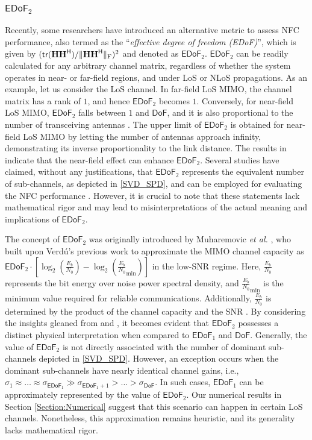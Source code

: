 \documentclass[journal]{IEEEtran}
\theoremstyle{definition}
\begin{document}
\subsubsection{${\mathsf{EDoF}}_2$}
Recently, some researchers have introduced an alternative metric to assess NFC performance, also termed as the ``\emph{effective degree of freedom (EDoF)}'', which is given by $({\mathsf{tr}}({\mathbf{HH}}^{\mathsf{H}})/\lVert{\mathbf{HH}}^{\mathsf{H}}\rVert_{\rm{F}})^2$ and denoted as ${\mathsf{EDoF}}_2$. ${\mathsf{EDoF}}_2$ can be readily calculated for any arbitrary channel matrix, regardless of whether the system operates in near- or far-field regions, and under LoS or NLoS propagations. As an example, let us consider the LoS channel. In far-field LoS MIMO, the channel matrix has a rank of $1$, and hence ${\mathsf{EDoF}}_2$ becomes $1$. Conversely, for near-field LoS MIMO, ${\mathsf{EDoF}}_2$ falls between $1$ and ${\mathsf{DoF}}$, and it is also proportional to the number of transceiving antennas \cite{Xie2023}. The upper limit of ${\mathsf{EDoF}}_2$ is obtained for near-field LoS MIMO by letting the number of antennas approach infinity, demonstrating its inverse proportionality to the link distance. The results in \cite{Xie2023} indicate that the near-field effect can enhance ${\mathsf{EDoF}}_2$. Several studies have claimed, without any justifications, that ${\mathsf{EDoF}}_2$ represents the equivalent number of sub-channels, as depicted in {\figurename} {\ref{SVD_SPD}}, and can be employed for evaluating the NFC performance \cite{Xie2023}. However, it is crucial to note that these statements lack mathematical rigor and may lead to misinterpretations of the actual meaning and implications of ${\mathsf{EDoF}}_2$.

The concept of ${\mathsf{EDoF}}_2$ was originally introduced by Muharemovic \emph{et al.} \cite{Muharemovic2008}, who built upon Verd\'{u}'s previous work \cite{Verdu2002} to approximate the MIMO channel capacity as ${\mathsf{EDoF}}_2\cdot[\log_2(\frac{E_b}{N_0})-\log_2({\frac{E_b}{N_0}}_{\min})]$ in the low-SNR regime. Here, $\frac{E_b}{N_0}$ represents the bit energy over noise power spectral density, and ${\frac{E_b}{N_0}}_{\min}$ is the minimum value required for reliable communications. Additionally, $\frac{E_b}{N_0}$ is determined by the product of the channel capacity and the SNR \cite[Eqn. (14)]{Verdu2002}. By considering the insights gleaned from \cite{Muharemovic2008} and \cite{Verdu2002}, it becomes evident that ${\mathsf{EDoF}}_2$ possesses a distinct physical interpretation when compared to ${\mathsf{EDoF}}_1$ and ${\mathsf{DoF}}$. Generally, the value of ${\mathsf{EDoF}}_2$ is not directly associated with the number of dominant sub-channels depicted in {\figurename} {\ref{SVD_SPD}}. However, an exception occurs when the dominant sub-channels have nearly identical channel gains, i.e., $\sigma_1\approx\ldots\approx\sigma_{\mathsf{EDoF}_1}\gg \sigma_{\mathsf{EDoF}_1+1}>\ldots>\sigma_{\mathsf{DoF}}$. In such cases, ${\mathsf{EDoF}}_1$ can be approximately represented by the value of ${\mathsf{EDoF}}_2$. Our numerical results in Section \ref{Section:Numerical} suggest that this scenario can happen in certain LoS channels. Nonetheless, this approximation remains heuristic, and its generality lacks mathematical rigor.
\end{document}
